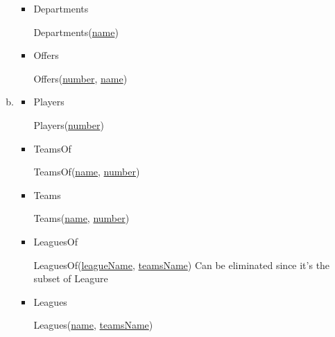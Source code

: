 \documentclass[12pt]{article}
\begin{document}
\begin{enumerate}[1.]
\begin{enumerate}[a)]
\begin{itemize}
            \item Departments

            \bigskip

            Departments(\underline{name})

            \bigskip

            \item Offers

            \bigskip

            Offers(\underline{number}, \underline{name})

            \bigskip
        \end{itemize}

        \item

        \begin{itemize}
            \item Players

            \bigskip

            Players(\underline{number})

            \item TeamsOf

            \bigskip

            TeamsOf(\underline{name}, \underline{number})

            \bigskip

            \item Teams

            \bigskip

            Teams(\underline{name}, \underline{number})

            \bigskip

            \item LeaguesOf

            \bigskip

            LeaguesOf(\underline{leagueName}, \underline{teamsName}) \color{red}Can be eliminated since it's the subset of Leagure\color{black}

            \item Leagues

            \bigskip

            Leagues(\underline{name}, \underline{teamsName})

            \bigskip

        \end{itemize}

        \bigskip


\end{enumerate}
\end{enumerate}
\end{document}
